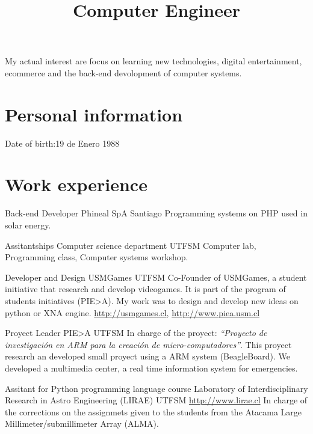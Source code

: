 \documentclass[letter,10pt]{moderncv}
\title{Computer Engineer}               %
\begin{document}
\maketitle
\vspace{-20pt}
\begin{center}
    My actual interest are focus on learning new technologies, digital entertainment,
    ecommerce and the back-end devolopment of computer systems.

 \end{center}
\section{Personal information}
           {Date of birth:}{19 de Enero 1988}
           {}{}

\section{Work experience}

        {Back-end Developer}
        {Phineal SpA}
        {Santiago}
        {}
        {Programming systems on PHP used in solar energy.}

        {Assitantships}
        {Computer science department}
        {UTFSM}
        {}
        {Computer lab, Programming class, Computer systems workshop.}

        {Developer and Design}
        {USMGames}
        {UTFSM}
        {Co-Founder of USMGames, a student initiative that research and develop videogames.
	 It is part of the program of students initiatives (PIE>A).
	 My work was to design and develop new ideas on python or XNA engine.}
        {\url{http://usmgames.cl}, \url{http://www.piea.usm.cl}}

        {Proyect Leader}
        {PIE>A}
        {UTFSM}
        {}
        {In charge of the proyect: \emph{``Proyecto de investigación en ARM
        para la creación de micro-computadores''}. This proyect research an developed
        small proyect using a ARM system (BeagleBoard). We developed a multimedia center, 
	a real time information system for emergencies.}

        {Assitant for Python programming language course}
        {Laboratory of Interdisciplinary Research in Astro Engineering (LIRAE)}
        {UTFSM}
        {\url{http://www.lirae.cl}}
        {In charge of the corrections on the assignmets given to the students from the
        Atacama Large Millimeter/submillimeter Array (ALMA).}
\end{document}
